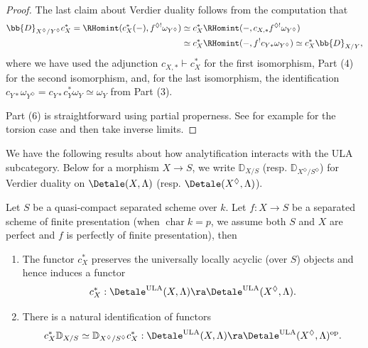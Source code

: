 \documentclass[letterpaper,11pt]{amsart}
\begin{document}
\begin{proof}
The last claim about Verdier duality follows from the computation that 
\begin{align*}
    \bb{D}_{X^{\Diamond}/Y^\Diamond}c_{X}^\ast= \RHomint(c_X^\ast(-), f^{\Diamond!}\omega_{Y^\Diamond})
    &\simeq c_X^\ast\RHomint(-, c_{X,\ast}f^{\Diamond!}\omega_{Y^\Diamond})\\
    &\simeq c_X^\ast\RHomint(-, f^{!}c_{Y\ast}\omega_{Y^\Diamond})\simeq c_{X}^{*}\bb{D}_{X/Y},
\end{align*}
where we have used the adjunction $c_{X,\ast}\vdash c_X^\ast$ for the first isomorphism, Part (4) for the second isomorphism, and, for the last isomorphism, the identification $c_{Y\ast}\omega_{Y^\Diamond}=c_{Y\ast}c_Y^\ast\omega_{Y}\simeq\omega_Y$ from Part (3).

Part (6) is straightforward using partial properness. See for example \cite[Proposition~4.4.6]{GHILZIsocComparison} for the torsion case and then take inverse limits.
\end{proof}

We have the following results about how analytification interacts with the ULA subcategory. Below for a morphism $X\to S$, we write $\mathbb{D}_{X/S}$ (resp. $\mathbb{D}_{X^{\Diamond}/S^\Diamond}$) for Verdier duality on $\Detale(X,\Lambda)$ (resp. $\Detale(X^{\Diamond},\Lambda)$). 

\begin{proposition}{\label{prop: constructiblealgebrizestoULA}}
Let $S$ be a quasi-compact separated scheme over $k$. Let $f: X\to S$ be a separated scheme of finite presentation (when $\operatorname{char}k=p$, we assume both $S$ and $X$ are perfect and $f$ is perfectly of finite presentation), then 
\begin{enumerate}
\item The functor $c_{X}^{*}$ preserves the universally locally acyclic (over $S$) objects and hence induces a functor
\[ c_{X}^\ast:\Detale^{\mathrm{ULA}}(X,\Lambda) \ra \Detale^{\mathrm{ULA}}(X^{\Diamond},\Lambda).\] 
\item There is a natural identification of functors
\[c_{X}^{*}\mathbb{D}_{X/S} \simeq \mathbb{D}_{X^{\Diamond}/S^\Diamond}c_{X}^{*}: \Detale^{\mathrm{ULA}}(X,\Lambda) \ra \Detale^{\mathrm{ULA}}(X^{\Diamond},\Lambda)^{\mathrm{op}}.\]
\end{enumerate}
\end{proposition}
\end{document}
